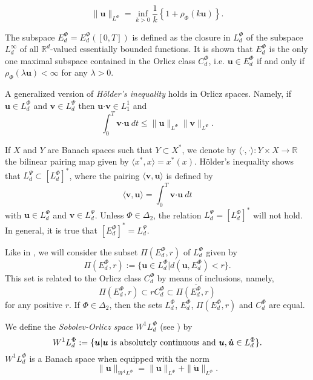 \documentclass[twoside]{article}
\theoremstyle{remark}
\newcommand{\orlnor}{\|_{L^{\Phi}}}
\newcommand{\lphi}{L^{\Phi}}
\newcommand{\lpsi}{L^{\Psi}}
\newcommand{\ephi}{E^{\Phi}}
\newcommand{\claseor}{C^{\Phi}}
\newcommand{\wphi}{W^{1}\lphi}
\renewcommand{\b}[1]{\boldsymbol{#1}}
\newcommand{\ccdot}{\b{\cdot}}
\renewcommand{\leq}{\leqslant}
\begin{document}
\begin{equation}\label{amemiya}
\|\b{u}\orlnor=\inf\limits_{k>0}\frac{1}{k}\left\{1+\rho_{\Phi}(k\b{u})\right\}.
\end{equation}



The subspace $\ephi_d=\ephi_d([0,T])$ is defined as the closure in $\lphi_d$ of the subspace $L^{\infty}_d$ of all $\mathbb{R}^d$-valued essentially bounded functions. It is shown that  $\ephi_d$ is the only one maximal subspace contained in the Orlicz class $\claseor_d$, i.e. 
$\b{u}\in\ephi_d$ if and only if $\rho_{\Phi}(\lambda \b{u})<\infty$ for any $\lambda>0$.  

A generalized version of \emph{H\"older's inequality} holds in Orlicz spaces. Namely, if $\b{u}\in\lphi_d$ and $\b{v}\in\lpsi_d$ then $\b{u}\ccdot\b{v}\in L_1^1$ and
\begin{equation}\label{holder}
\int_0^T\b{v}\ccdot\b{u}\ dt\leq \|\b{u}\orlnor\|\b{v}\|_{L^{\Psi}}.
\end{equation}




If $X$ and $Y$ are  Banach spaces such that  $Y\subset X^*$, we denote by $\langle\cdot,\cdot\rangle:Y\times X\to\mathbb{R}$ the bilinear pairing  map given by $\langle x^*,x\rangle=x^*(x)$. H\"older's inequality shows that $\lpsi_d\subset \left[\lphi_d\right]^*$, where the pairing  
$\langle \b{v}, \b{u}\rangle$
is defined by 
\begin{equation}\label{pairing}
  \langle \b{v},\b{u}\rangle=\int_0^T\b{v}\ccdot\b{u}\ dt
\end{equation}
with  $\b{u}\in\lphi_d$ and $\b{v}\in\lpsi_d$.
 Unless $\Phi \in \Delta_2$, the relation $\lpsi_d= \left[\lphi_d\right]^*$ will not hold. In general, it is true  that  $\left[\ephi_d\right]^*=\lpsi_d$.


Like in \cite{KR}, we will consider the subset $\Pi(\ephi_d,r)$ of $\lphi_d$ given by
\[\Pi(\ephi_d,r):=\{\b{u}\in\lphi_d| d(\b{u},\ephi_d)<r\}.\]
This set is related to the Orlicz class $\claseor_d$ by means of inclusions, namely,
\begin{equation}\label{inclusiones}\Pi(\ephi_d, r )\subset r \claseor_d\subset\overline{\Pi(\ephi_d,r)}
\end{equation}
for any positive $r$.
If $\Phi \in \Delta_2$,  then the sets $\lphi_d$, $\ephi_d$, $\Pi(\ephi_d,r)$ and $\claseor_d$ are equal.



We define the \emph{Sobolev-Orlicz space} $\wphi_d$ (see \cite{adams_sobolev}) by
\[\wphi_d:=\{\b{u}| \b{u} \hbox{ is absolutely continuous and } \b{u},\b{\dot{u}}\in \lphi_d\}.\]
$\wphi_d$ is a Banach space when equipped with the norm
\[
\|  \b{u}  \|_{\wphi}= \|  \b{u}  \|_{\lphi} + \|\b{\dot{u}}\orlnor.
\]
\end{document}
